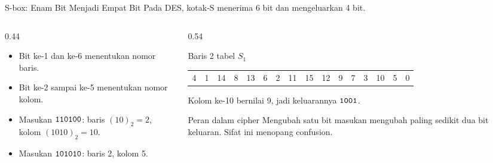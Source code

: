 \documentclass[aspectratio=169,11pt]{beamer}
\begin{document}
\begin{frame}{S-box: Enam Bit Menjadi Empat Bit}
    \footnotesize
    Pada DES, kotak-S menerima 6 bit dan mengeluarkan 4 bit.
    \begin{columns}[T,onlytextwidth]
        \begin{column}{0.44\textwidth}
            \begin{itemize}
                \item Bit ke-1 dan ke-6 menentukan nomor baris.
                \item Bit ke-2 sampai ke-5 menentukan nomor kolom.
                \item Masukan $\texttt{110100}$: baris
                      $(10)_2=2$, kolom $(1010)_2=10$.
                \item Masukan $\texttt{101010}$: baris 2, kolom 5.
            \end{itemize}
        \end{column}
        \begin{column}{0.54\textwidth}
            \begin{exampleblock}{Baris 2 tabel $S_1$}
                \scriptsize
                \setlength{\tabcolsep}{1.2pt}
                \begin{center}
                    \begin{tabular}{@{}*{16}{c}@{}}
                        4 & 1 & 14 & 8 & 13 & 6 & 2 & 11 & 15 & 12
                        & 9 & 7 & 3 & 10 & 5 & 0 \\
                    \end{tabular}
                \end{center}
                Kolom ke-10 bernilai 9, jadi keluarannya
                $\texttt{1001}$.
            \end{exampleblock}
            \begin{alertblock}{Peran dalam cipher}
                \footnotesize
                Mengubah satu bit masukan mengubah paling sedikit dua bit
                keluaran. Sifat ini menopang confusion.
            \end{alertblock}
        \end{column}
    \end{columns}
\end{frame}
\end{document}
